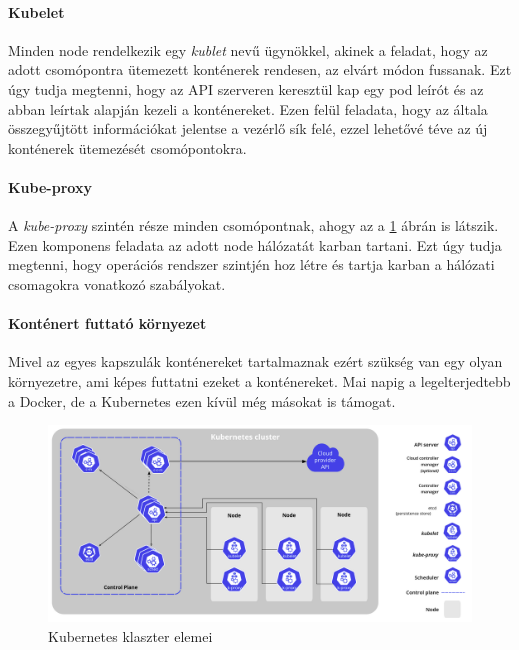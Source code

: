 \paragraph{Kubelet} Minden node rendelkezik egy \textit{kublet} nevű ügynökkel, akinek a feladat, hogy az adott csomópontra ütemezett konténerek rendesen, az elvárt módon fussanak. Ezt úgy tudja megtenni, hogy az API szerveren keresztül kap egy pod leírót és az abban leírtak alapján kezeli a konténereket. Ezen felül feladata, hogy az általa összegyűjtött információkat jelentse a vezérlő sík felé, ezzel lehetővé téve az új konténerek ütemezését csomópontokra. 

\paragraph{Kube-proxy} A \textit{kube-proxy} szintén része minden csomópontnak, ahogy az a \ref{fig:k8s_components} ábrán is látszik. Ezen komponens feladata az adott node hálózatát karban tartani. Ezt úgy tudja megtenni, hogy operációs rendszer szintjén hoz létre és tartja karban a hálózati csomagokra vonatkozó szabályokat.

\paragraph{Konténert futtató környezet} Mivel az egyes kapszulák konténereket tartalmaznak ezért szükség van egy olyan környezetre, ami képes futtatni ezeket a konténereket. Mai napig a legelterjedtebb a Docker, de a Kubernetes ezen kívül még másokat is támogat. 

\begin{figure}[!ht]
\centering
\includegraphics[width=150mm, keepaspectratio]{figures/kubernetes_components.png}
\caption{Kubernetes klaszter elemei\citep{KubernetesComponents}}
\label{fig:k8s_components}
\end{figure}


